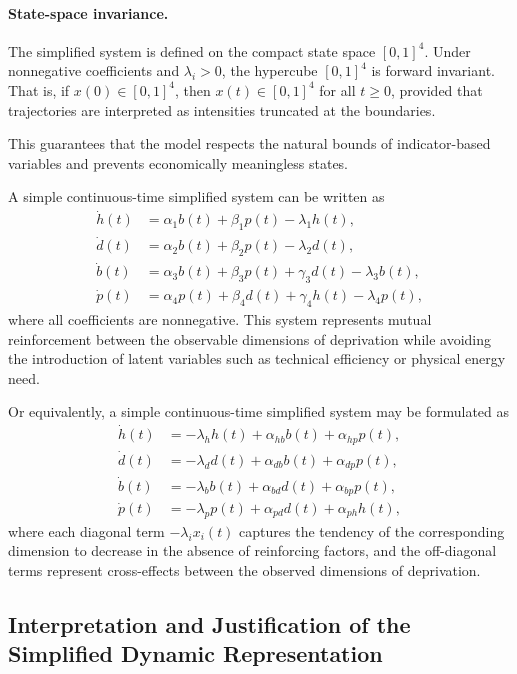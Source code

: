 \documentclass[11pt,a4paper]{article}
\begin{document}

\paragraph{State-space invariance.}
The simplified system is defined on the compact state space $[0,1]^4$. Under
nonnegative coefficients and $\lambda_i>0$, the hypercube $[0,1]^4$ is forward
invariant. That is, if $x(0)\in[0,1]^4$, then $x(t)\in[0,1]^4$ for all $t\ge0$,
provided that trajectories are interpreted as intensities truncated at the
boundaries.

This guarantees that the model respects the natural bounds of indicator-based
variables and prevents economically meaningless states.

A simple continuous-time simplified system can be written as
\begin{align}
\dot{h}(t) &= \alpha_1 b(t)+\beta_1 p(t)-\lambda_1 h(t),\\
\dot{d}(t) &= \alpha_2 b(t)+\beta_2 p(t)-\lambda_2 d(t),\\
\dot{b}(t) &= \alpha_3 b(t)+\beta_3 p(t)+\gamma_3 d(t)-\lambda_3 b(t),\\
\dot{p}(t) &= \alpha_4 p(t)+\beta_4 d(t)+\gamma_4 h(t)-\lambda_4 p(t),
\end{align}
where all coefficients are nonnegative. This system represents mutual reinforcement between the observable dimensions of deprivation while avoiding the introduction of latent variables such as technical efficiency or physical energy need.

Or equivalently, a simple continuous-time simplified system may be formulated as
\begin{align}
\dot{h}(t) &= -\lambda_h h(t) + \alpha_{hb} b(t) + \alpha_{hp} p(t),\\
\dot{d}(t) &= -\lambda_d d(t) + \alpha_{db} b(t) + \alpha_{dp} p(t),\\
\dot{b}(t) &= -\lambda_b b(t) + \alpha_{bd} d(t) + \alpha_{bp} p(t),\\
\dot{p}(t) &= -\lambda_p p(t) + \alpha_{pd} d(t) + \alpha_{ph} h(t),
\end{align}
where each diagonal term \(-\lambda_i x_i(t)\) captures the tendency of the corresponding dimension to decrease in the absence of reinforcing factors, and the off-diagonal terms represent cross-effects between the observed dimensions of deprivation.
\subsection{Interpretation and Justification of the Simplified Dynamic Representation}
\end{document}
